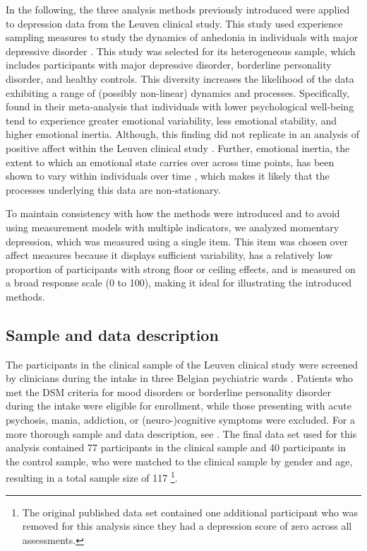 \documentclass[man, floatsintext]{apa7}
\begin{document}
In the following, the three analysis methods previously introduced were applied
to depression data from the Leuven clinical study. This study used experience
sampling measures to study the dynamics of anhedonia in individuals with major
depressive disorder \parencite{heininga_dynamical_2019}. This study was
selected for its heterogeneous sample, which includes participants with major
depressive disorder, borderline personality disorder, and healthy controls.
This diversity increases the likelihood of the data exhibiting a range of
(possibly non-linear) dynamics and processes. Specifically,
\textcite{houben_relation_2015} found in their meta-analysis that individuals
with lower psychological well-being tend to experience greater emotional
variability, less emotional stability, and higher emotional inertia. Although,
this finding did not replicate in an analysis of positive affect within the
Leuven clinical study \parencite{heininga_dynamical_2019}. Further, emotional
inertia, the extent to which an emotional state carries over across time
points, has been shown to vary within individuals over time
\parencite{koval_changing_2012}, which makes it likely that the processes
underlying this data are non-stationary.

To maintain consistency with how the methods were introduced and to avoid using
measurement models with multiple indicators, we analyzed momentary depression,
which was measured using a single item. This item was chosen over affect
measures because it displays sufficient variability, has a relatively low
proportion of participants with strong floor or ceiling effects, and is
measured on a broad response scale (0 to 100), making it ideal for illustrating
the introduced methods.

\subsection{Sample and data description}

The participants in the clinical sample of the Leuven clinical study were
screened by clinicians during the intake in three Belgian psychiatric wards
\parencite{heininga_dynamical_2019}. Patients who met the DSM criteria for mood
disorders or borderline personality disorder during the intake were eligible
for enrollment, while those presenting with acute psychosis, mania, addiction,
or (neuro-)cognitive symptoms were excluded. For a more thorough sample and
data description, see \textcite{heininga_dynamical_2019}. The final data set
used for this analysis contained 77 participants in the clinical sample and 40
participants in the control sample, who were matched to the clinical sample by
gender and age, resulting in a total sample size of 117 \footnote{The original
  published data set contained one additional participant who was removed for
  this analysis since they had a depression score of zero across all
  assessments.}.
\end{document}
